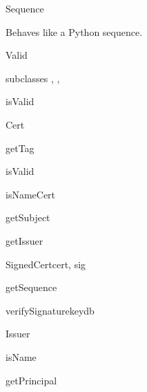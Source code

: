 \documentclass{howto}
\begin{document}
\begin{classdesc}{Sequence}{}

Behaves like a Python sequence.

\end{classdesc}

\begin{classdesc}{Valid}{}

subclasses , , 

\begin{methoddesc}{isValid}{}
\end{methoddesc}

\end{classdesc}

\begin{classdesc}{Cert}{}

\begin{methoddesc}{getTag}{}
\end{methoddesc}

\begin{methoddesc}{isValid}{}
\end{methoddesc}

\begin{methoddesc}{isNameCert}{}
\end{methoddesc}

\begin{methoddesc}{getSubject}{}
\end{methoddesc}

\begin{methoddesc}{getIssuer}{}
\end{methoddesc}

\end{classdesc}

\begin{classdesc}{SignedCert}{cert, sig}

\begin{methoddesc}{getSequence}{}
\end{methoddesc}

\begin{methoddesc}{verifySignature}{keydb}
\end{methoddesc}

\end{classdesc}

\begin{classdesc}{Issuer}{}

\begin{methoddesc}{isName}{}
\end{methoddesc}

\begin{methoddesc}{getPrincipal}{}
\end{methoddesc}

\end{classdesc}
\end{document}
